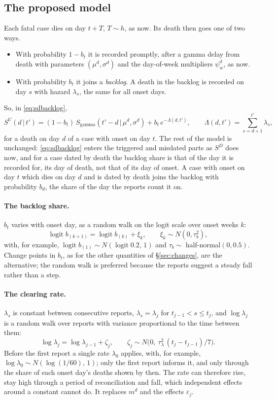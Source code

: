 \documentclass[11pt,a4paper]{article}
\newcommand{\given}{\,|\,}
\begin{document}
\subsection{The proposed model}

Each fatal case dies on day $t+T$, $T\sim h$, as now. Its death then goes
one of two ways.
\begin{itemize}
\item With probability $1-b_t$ it is recorded promptly, after a gamma delay
from death with parameters $(\mu^{d},\sigma^{d})$ and the day-of-week
multipliers $\psi^{d}_w$, as now.
\item With probability $b_t$ it joins a \emph{backlog}. A death in the
backlog is recorded on day $s$ with hazard $\lambda_s$, the same for all
onset days.
\end{itemize}
So, in \eqref{eq:sdbacklog},
\begin{equation}
S^{U}(d\given t')=(1-b_t)\,S_{\mathrm{gamma}}(t'-d\given\mu^{d},\sigma^{d})
+b_t\,e^{-\Lambda(d,t')},\qquad
\Lambda(d,t')=\sum_{s=d+1}^{t'}\lambda_s,
\label{eq:backlog}
\end{equation}
for a death on day $d$ of a case with onset on day $t$. The rest of the
model is unchanged: \eqref{eq:sdbacklog} enters the triggered and misdated
parts as $S^{D}$ does now, and for a case dated by death the backlog share is
that of the day it is recorded for, its day of death, not that of its day of
onset. A case with onset on day $t$ which dies on day $d$ and is dated by
death joins the backlog with probability $b_d$, the share of the day the
reports count it on.

\paragraph{The backlog share.} $b_t$ varies with onset day, as a random walk
on the logit scale over onset weeks $k$:
\[
\operatorname{logit} b_{(k+1)}=\operatorname{logit} b_{(k)}+\xi_k,\qquad
\xi_k\sim N(0,\tau_b^{2}),
\]
with, for example, $\operatorname{logit}b_{(1)}\sim N(\operatorname{logit}0.2,\,1)$
and $\tau_b\sim$ half-normal$(0,0.5)$. Change points in $b_t$, as for the
other quantities of \S\ref{sec:changes}, are the alternative; the random
walk is preferred because the reports suggest a steady fall rather than a
step.

\paragraph{The clearing rate.} $\lambda_s$ is constant between consecutive
reports, $\lambda_s=\lambda_j$ for $t_{j-1}<s\le t_j$, and $\log\lambda_j$ is a
random walk over reports with variance proportional to the time between
them:
\[
\log\lambda_j=\log\lambda_{j-1}+\zeta_j,\qquad
\zeta_j\sim N\bigl(0,\ \tau_\lambda^{2}\,(t_j-t_{j-1})/7\bigr).
\]
Before the first report a single rate $\lambda_0$ applies, with, for example,
$\log\lambda_0\sim N(\log(1/60),\,1)$; only the first report informs it, and
only through the share of each onset day's deaths shown by then. The rate
can therefore rise, stay high through a period of reconciliation and fall,
which independent effects around a constant cannot do. It replaces $m^{d}$
and the effects $\varepsilon_j$.
\end{document}
